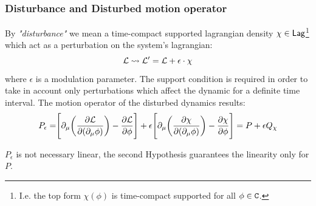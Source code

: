 \documentclass[Main]{subfiles}
\begin{document}
	\subsubsection{Disturbance and Disturbed motion operator }
		By \emph{"disturbance"} we mean a time-compact supported lagrangian density $\chi \in \mathsf{Lag}$\footnote{I.e. the top form $\chi(\phi)$ is time-compact supported for all $\phi \in \mathtt{C}$.} which act as a perturbation on the system's lagrangian:
		\begin{displaymath}
			\mathcal{L} \rightsquigarrow \mathcal{L}' = \mathcal{L} + \epsilon\cdot \chi
		\end{displaymath}
		where $\epsilon$  is a modulation parameter.
		The support condition is required in order to take in account only perturbations which affect the dynamic for a definite time interval.
		The motion operator of the disturbed dynamics results:
		\begin{equation}
			P_\epsilon = \Biggr[ \partial_\mu \biggr( \frac{\partial \mathcal{L}}{\partial(\partial_\mu \phi)} \biggr) - \frac{\partial \mathcal{L}}{\partial \phi} \Biggr] + \epsilon \Biggr[ \partial_\mu \biggr( \frac{\partial \chi}{\partial(\partial_\mu \phi)} \biggr) - \frac{\partial \chi}{\partial \phi} \Biggr]
			= P + \epsilon Q_\chi		
		\end{equation}
		\begin{observation}
			$P_\epsilon$ is not necessary linear, the second Hypothesis guarantees the linearity only for $P$.
		\end{observation}
\end{document}
